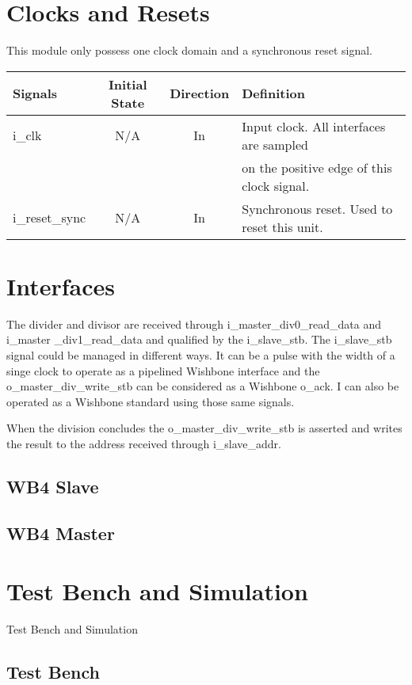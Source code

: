 \documentclass[letterpaper]{article}
\begin{document}
	\section{Clocks and Resets}
	
	This module only possess one clock domain and a synchronous reset signal.
	
    \begin{tabular}{l|c|c|l}
        Signals & Initial State & Direction & Definition \\ \hline
		i\_clk &  N/A & In & Input clock. All interfaces are sampled \\
		       &      &    & on the positive edge of this clock signal. \\  \hline
		i\_reset\_sync & N/A & In & Synchronous reset. Used to reset this unit. \\
	\end{tabular}
	
	\section{Interfaces}
	The divider and divisor are received through i\_master\_div0\_read\_data and i\_master \_div1\_read\_data and qualified by the i\_slave\_stb. The i\_slave\_stb signal could be managed in different ways. It can be a pulse with the width of a singe clock to operate as a pipelined Wishbone interface and the o\_master\_div\_write\_stb can be considered as a Wishbone o\_ack. I can also be operated as a Wishbone standard using those same signals.
	
	When the division concludes  the o\_master\_div\_write\_stb is asserted and writes the result to the address received through i\_slave\_addr.
	\subsection{WB4 Slave}
		
	\subsection{WB4 Master}
	
	\section{Test Bench and Simulation}
	Test Bench and Simulation
	
	\subsection{Test Bench}
	
\end{document}
